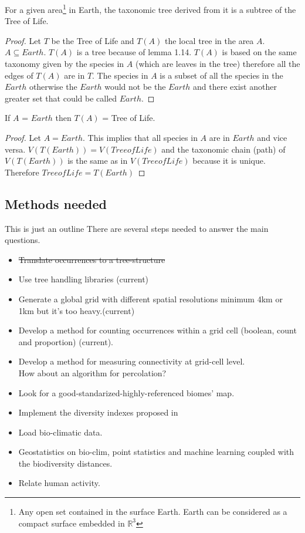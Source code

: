 \begin{proposition}
For a given area\footnote{Any open set contained in the surface Earth. Earth can be considered as a compact surface embedded in $\mathbb{R}^3$ } in Earth, the taxonomic tree derived from it is a subtree of the Tree of Life.
\end{proposition} 
\begin{proof}
Let $T$ be the Tree of Life and $T(A)$ the local tree in the area $A$. $A \subseteq Earth$. $T(A)$ is a tree because of lemma 1.14. $T(A)$ is based on the same taxonomy given by the species in $A$ (which are leaves in the tree) therefore all the edges of $T(A)$ are in $T$. The species in $A$ is a subset of all the species in the $Earth$ otherwise the $Earth$ would not be the $Earth$ and there exist another greater set that could be called $Earth$.
\end{proof}

\begin{corollary}
If $A$ = $Earth$ then $T(A)$ = Tree of Life.
\begin{proof}
Let $A = Earth$. This implies that all species in $A$ are in $Earth$ and vice versa.
$V(T(Earth)) = V(Tree of Life)$ and the taxonomic chain (path) of $V(T(Earth))$ is the same as in $V(Tree of Life)$ because it is unique. Therefore $Tree of Life = T(Earth)$
\end{proof}
\end{corollary}

\subsection{Methods needed}
This is just an outline
There are several steps needed to answer the main questions.

\begin{itemize}
\item \st{Translate occurrences to a tree-structure}
\item Use tree handling libraries (current)
\item Generate a global grid with different spatial resolutions minimum 4km or 1km but it's too heavy.(current)
\item Develop a method for counting occurrences within a grid cell (boolean, count and proportion) (current).
\item Develop a method for measuring connectivity at grid-cell level. \\
How about an algorithm for percolation?
\item Look for a good-standarized-highly-referenced biomes' map.
\item Implement the diversity indexes proposed in \citet{pavoine-2011}
\item Load bio-climatic data.
\item Geostatistics on bio-clim, point statistics and machine learning coupled with the biodiversity distances.
\item Relate human activity.
\end{itemize}

